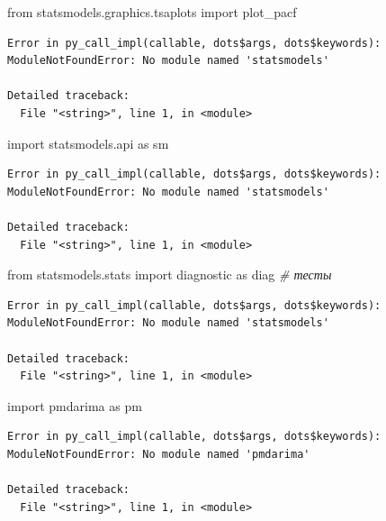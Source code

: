 \documentclass[]{book}
\newenvironment{Shaded}{\begin{snugshade}}{\end{snugshade}}
\newcommand{\CommentTok}[1]{\textcolor[rgb]{0.56,0.35,0.01}{\textit{#1}}}
\newcommand{\ImportTok}[1]{#1}
\newcommand{\NormalTok}[1]{#1}
\begin{document}
\begin{Shaded}
\begin{Highlighting}[]
\ImportTok{from}\NormalTok{ statsmodels.graphics.tsaplots }\ImportTok{import}\NormalTok{ plot_pacf}
\end{Highlighting}
\end{Shaded}

\begin{verbatim}
Error in py_call_impl(callable, dots$args, dots$keywords): ModuleNotFoundError: No module named 'statsmodels'

Detailed traceback: 
  File "<string>", line 1, in <module>
\end{verbatim}

\begin{Shaded}
\begin{Highlighting}[]
\ImportTok{import}\NormalTok{ statsmodels.api }\ImportTok{as}\NormalTok{ sm}
\end{Highlighting}
\end{Shaded}

\begin{verbatim}
Error in py_call_impl(callable, dots$args, dots$keywords): ModuleNotFoundError: No module named 'statsmodels'

Detailed traceback: 
  File "<string>", line 1, in <module>
\end{verbatim}

\begin{Shaded}
\begin{Highlighting}[]
\ImportTok{from}\NormalTok{ statsmodels.stats }\ImportTok{import}\NormalTok{ diagnostic }\ImportTok{as}\NormalTok{ diag }\CommentTok{# тесты}
\end{Highlighting}
\end{Shaded}

\begin{verbatim}
Error in py_call_impl(callable, dots$args, dots$keywords): ModuleNotFoundError: No module named 'statsmodels'

Detailed traceback: 
  File "<string>", line 1, in <module>
\end{verbatim}

\begin{Shaded}
\begin{Highlighting}[]
\ImportTok{import}\NormalTok{ pmdarima }\ImportTok{as}\NormalTok{ pm}
\end{Highlighting}
\end{Shaded}

\begin{verbatim}
Error in py_call_impl(callable, dots$args, dots$keywords): ModuleNotFoundError: No module named 'pmdarima'

Detailed traceback: 
  File "<string>", line 1, in <module>
\end{verbatim}
\end{document}
